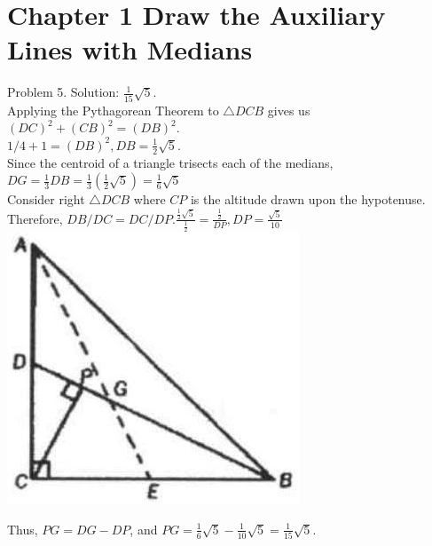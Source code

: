 \documentclass[10pt]{article}
\begin{document}
\section*{Chapter 1 Draw the Auxiliary Lines with Medians}
Problem 5. Solution: \(\frac{1}{15} \sqrt{5}\).\\
Applying the Pythagorean Theorem to \(\triangle D C B\) gives us\\
\((D C)^{2}+(C B)^{2}=(D B)^{2}\).\\
\(1 / 4+1=(D B)^{2}, D B=\frac{1}{2} \sqrt{5}\).\\
Since the centroid of a triangle trisects each of the medians,\\
\(D G=\frac{1}{3} D B=\frac{1}{3}\left(\frac{1}{2} \sqrt{5}\right)=\frac{1}{6} \sqrt{5}\)\\
Consider right \(\triangle D C B\) where \(C P\) is the altitude drawn upon the hypotenuse.\\
Therefore, \(D B / D C=D C / D P . \frac{\frac{1}{2} \sqrt{5}}{\frac{1}{2}}=\frac{\frac{1}{2}}{D P}, D P=\frac{\sqrt{5}}{10}\)\\
\includegraphics[max width=\textwidth, center]{2025_04_17_97bc1f7e44d93c271a88g-019}

Thus, \(P G=D G-D P\), and \(P G=\frac{1}{6} \sqrt{5}-\frac{1}{10} \sqrt{5}=\frac{1}{15} \sqrt{5}\).
\end{document}
